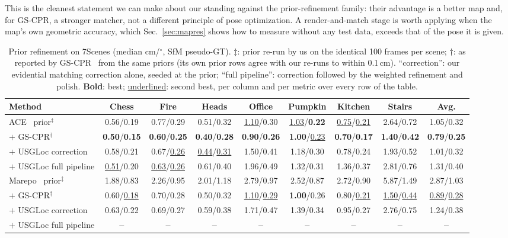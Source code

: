\documentclass[journal]{IEEEtran}
\newcommand{\res}{{\color{red}\textbf{--}}}
\newcommand{\method}{USGLoc}
\begin{document}
This is the cleanest statement we can make about our standing against the
prior-refinement family: their advantage is a better map and, for GS-CPR, a
stronger matcher, not a different principle of pose optimization. A
render-and-match stage is worth applying when the map's own geometric
accuracy, which Sec.~\ref{sec:mapres} shows how to measure without any test
data, exceeds that of the pose it is given.

\begin{table}[t]
\centering
\caption{Prior refinement on 7Scenes (median cm/$^\circ$, SfM pseudo-GT). $\ddagger$: prior re-run by us on the identical 100 frames per scene; $\dagger$: as reported by GS-CPR~\cite{gscpr} from the same priors (its own prior rows agree with our re-runs to within 0.1\,cm). ``correction'': our evidential matching correction alone, seeded at the prior; ``full pipeline'': correction followed by the weighted refinement and polish. \textbf{Bold}: best; \underline{underlined}: second best, per column and per metric over every row of the table. }
\label{tab:prior}
\setlength{\tabcolsep}{2.2pt}
\footnotesize
\begin{tabular}{@{}lcccccccc@{}}
\toprule
Method & Chess & Fire & Heads & Office & Pumpkin & Kitchen & Stairs & Avg.\\
\midrule
ACE~\cite{ace} prior$^\ddagger$ & 0.56/0.19 & 0.77/0.29 & 0.51/0.32 & \underline{1.10}/0.30 & \underline{1.03}/\textbf{0.22} & \underline{0.75}/\underline{0.21} & 2.64/0.72 & 1.05/0.32\\
\quad $+$ GS-CPR$^\dagger$ & \textbf{0.50}/\textbf{0.15} & \textbf{0.60}/\textbf{0.25} & \textbf{0.40}/\textbf{0.28} & \textbf{0.90}/\textbf{0.26} & \textbf{1.00}/\underline{0.23} & \textbf{0.70}/\textbf{0.17} & \textbf{1.40}/\textbf{0.42} & \textbf{0.79}/\textbf{0.25}\\
\quad $+$ \method{} correction & 0.58/0.21 & 0.67/\underline{0.26} & \underline{0.44}/\underline{0.31} & 1.50/0.41 & 1.18/0.30 & 0.78/0.24 & 1.93/0.52 & 1.01/0.32\\
\quad $+$ \method{} full pipeline & \underline{0.51}/0.20 & \underline{0.63}/\underline{0.26} & 0.61/0.40 & 1.96/0.49 & 1.32/0.31 & 1.36/0.37 & 2.81/0.76 & 1.31/0.40\\
\midrule
Marepo~\cite{marepo} prior$^\ddagger$ & 1.88/0.83 & 2.26/0.95 & 2.01/1.18 & 2.79/0.97 & 2.52/0.87 & 2.72/0.90 & 5.87/1.49 & 2.87/1.03\\
\quad $+$ GS-CPR$^\dagger$ & 0.60/\underline{0.18} & 0.70/0.28 & 0.50/0.32 & \underline{1.10}/\underline{0.29} & \textbf{1.00}/0.26 & 0.80/\underline{0.21} & \underline{1.50}/\underline{0.44} & \underline{0.89}/\underline{0.28}\\
\quad $+$ \method{} correction & 0.63/0.22 & 0.69/0.27 & 0.59/0.38 & 1.71/0.47 & 1.39/0.34 & 0.95/0.27 & 2.76/0.75 & 1.24/0.38\\
\quad $+$ \method{} full pipeline & \res & \res & \res & \res & \res & \res & \res & \res\\
\bottomrule
\end{tabular}
\end{table}
\end{document}
